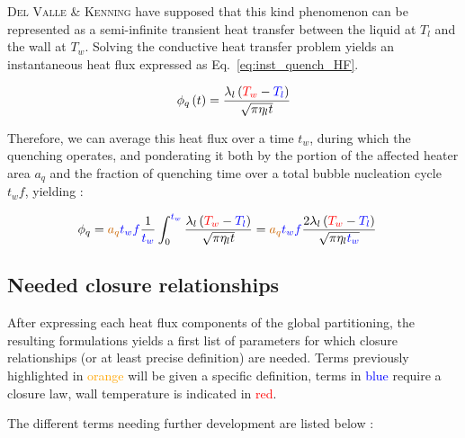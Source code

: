 \textsc{Del Valle} \& \textsc{Kenning} have supposed that this kind phenomenon can be represented as a semi-infinite transient heat transfer between the liquid at $T_{l}$ and the wall at $T_{w}$. Solving the conductive heat transfer problem yields an instantaneous heat flux expressed as Eq.~\ref{eq:inst_quench_HF}.

\begin{align}
\label{eq:inst_quench_HF}
\phi_{q}\parth{t} = \frac{\lambda_{l}\parth{\redmath{T_{w}}-\bluemath{T_{l}}} }{\sqrt{\pi \eta_{l} t} }
\end{align}


Therefore, we can average this heat flux over a time $t_{w}$, during which the quenching operates, and ponderating it both by the portion of the affected heater area $a_{q}$ and the fraction of quenching time over a total bubble nucleation cycle $t_{w}f$, yielding : 

\begin{align}
\phi_{q}&=\orangemath{a_{q}} \bluemath{t_{w}} \bluemath{f} \frac{1}{\bluemath{t_{w}} } \int_{0}^{  \bluemath{t_{w}} } \frac{\lambda_{l}\parth{\redmath{T_{w}}-\bluemath{T_{l}} }}{\sqrt{\pi \eta_{l} t }} = \orangemath{a_{q}} \bluemath{t_{w}} \bluemath{f} \frac{2 \lambda_{l} \parth{\redmath{T_{w}} - \bluemath{T_{l}} } }{\sqrt{\pi \eta_{l} \bluemath{t_{w}} } }
\end{align}


\subsection{Needed closure relationships}

After expressing each heat flux components of the global partitioning, the resulting formulations yields a first list of parameters for which closure relationships (or at least precise definition) are needed. Terms previously highlighted in \textcolor{orange}{orange} will be given a specific definition, terms in \textcolor{blue}{blue} require a closure law, wall temperature is indicated in \textcolor{red}{red}.

\npar

The different terms needing further development are listed below :

